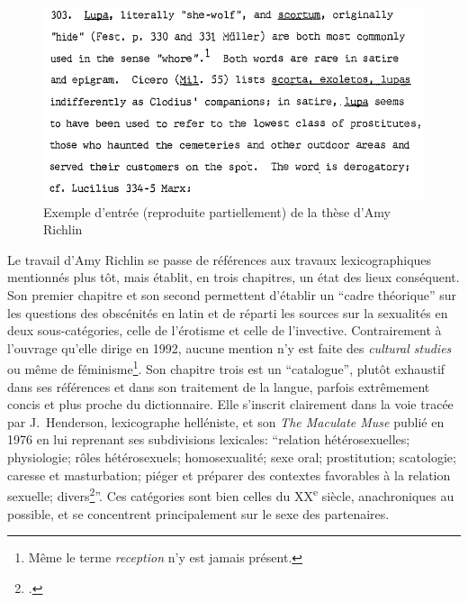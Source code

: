 \begin{figure}
    \centering
    \includegraphics[width=.7\linewidth]{figures/chap1/part3/303_AmyRichlin.png}
    \caption{Exemple d'entrée (reproduite partiellement) de la thèse d'Amy Richlin}
    \label{fig:chap1:entry_richlin}
\end{figure}

Le travail d'Amy Richlin se passe de références aux travaux lexicographiques mentionnés plus tôt, mais établit, en trois chapitres, un état des lieux conséquent. Son premier chapitre et son second permettent d'établir un \enquote{cadre théorique} sur les questions des obscénités en latin et de réparti les sources sur la sexualités en deux sous-catégories, celle de l'érotisme et celle de l'invective. Contrairement à l'ouvrage qu'elle dirige en 1992, aucune mention n'y est faite des \textit{cultural studies} ou même de féminisme\footnote{Même le terme \textit{reception} n'y est jamais présent.}. Son chapitre trois est un \enquote{catalogue}, plutôt exhaustif dans ses références et dans son traitement de la langue, parfois extrêmement concis et plus proche du dictionnaire. Elle s'inscrit clairement dans la voie tracée par J.~Henderson, lexicographe helléniste, et son \textit{The Maculate Muse} publié en 1976 en lui reprenant ses subdivisions lexicales: \enquote{relation hétérosexuelles; physiologie; rôles hétérosexuels; homosexualité; sexe oral; prostitution; scatologie; caresse et masturbation; piéger et préparer des contextes favorables à la relation sexuelle; divers\footcite[\textit{Abstract}, p.~II]{richlin_sexual_1978}}. Ces catégories sont bien celles du XX\textsuperscript{e} siècle, anachroniques au possible, et se concentrent principalement sur le sexe des partenaires.


